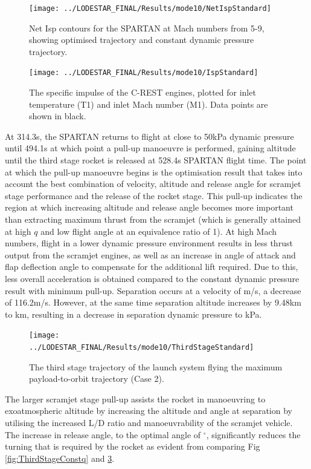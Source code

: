 \begin{figure}[ht!]
	\centering
	\texttt{[image: ../LODESTAR\_FINAL/Results/mode10/NetIspStandard]}
	\caption{Net Isp contours for the SPARTAN at Mach numbers from 5-9, showing optimised trajectory and constant dynamic pressure trajectory.}
	\label{fig:NetIspStandardNoReturn}
\end{figure}

\begin{figure}[ht!]
	\centering
	\texttt{[image: ../LODESTAR\_FINAL/Results/mode10/IspStandard]}
	\caption{The specific impulse of the C-REST engines, plotted for inlet temperature (T1) and inlet Mach number (M1). Data points are shown in black.}
	\label{fig:IspStandard}
\end{figure}


At 314.3s, the SPARTAN returns to flight at close to 50kPa dynamic pressure until 494.1s at which point a pull-up manoeuvre is performed, gaining altitude until the third stage rocket is released at 528.4s SPARTAN flight time. 
 The point at which the pull-up manoeuvre begins is the optimisation result that takes into account the best combination of velocity, altitude and release angle for scramjet stage performance and the release of the rocket stage. This pull-up indicates the region at which increasing altitude and release angle becomes more important than extracting maximum thrust from the scramjet (which is generally attained at high $q$ and low flight angle at an equivalence ratio of 1).
At high Mach numbers, flight in a lower dynamic pressure environment results in less thrust output from the scramjet engines, as well as an increase in angle of attack and flap deflection angle to compensate for the additional lift required. Due to this, less overall acceleration is obtained compared to the constant dynamic pressure result with minimum pull-up. Separation occurs at a velocity of \secondthirdSeparationvStandardNoReturn m/s, a decrease of 116.2m/s. However, at the same time separation altitude increases by 9.48km to \secondthirdSeparationAltqStandardNoReturn km, resulting in a decrease in separation dynamic pressure to \secondthirdSeparationqStandardNoReturn kPa. 
\begin{figure}[ht!]
	\centering
	\texttt{[image: ../LODESTAR\_FINAL/Results/mode10/ThirdStageStandard]}
	\caption{The third stage trajectory of the launch system flying the maximum payload-to-orbit trajectory (Case 2).}
	\label{fig:ThirdStageStandardNoReturn}
\end{figure}
The larger scramjet stage pull-up assists the rocket in manoeuvring to exoatmospheric altitude by increasing the altitude and angle at separation by utilising the increased L/D ratio and manoeuvrability of the scramjet vehicle. The increase in release angle, to the optimal angle of \secondthirdSeparationgammaStandardNoReturn$^\circ$, significantly reduces the turning that is required by the rocket as evident from comparing Fig \ref{fig:ThirdStageConstq} and \ref{fig:ThirdStageStandardNoReturn}. 
